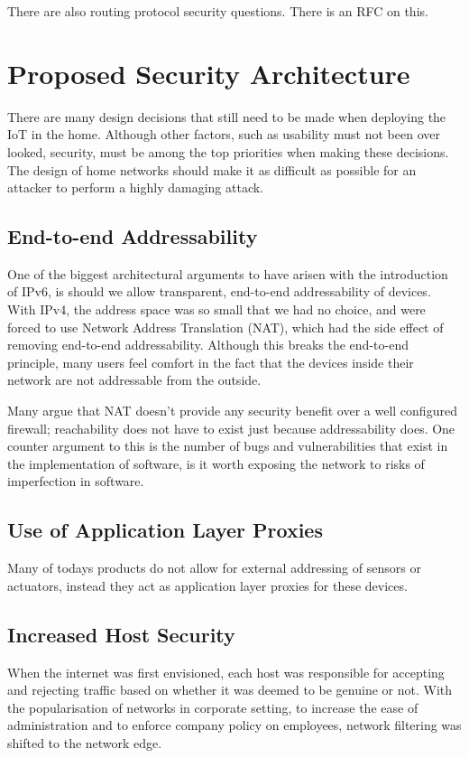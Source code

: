 \documentclass[10pt,journal,compsoc]{IEEEtran}
\begin{document}
There are also routing protocol security questions. There is an RFC on this.  

\section{Proposed Security Architecture}
There are many design decisions that still need to be made when deploying the
IoT in the home. Although other factors, such as usability must not been over
looked, security, must be among the top priorities when making these decisions.
The design of home networks should make it as difficult as possible for an
attacker to perform a highly damaging attack. 

\subsection{End-to-end Addressability}
One of the biggest architectural arguments to have arisen with the introduction
of IPv6, is should we allow transparent, end-to-end addressability of devices.
With IPv4, the address space was so small that we had no choice, and were
forced to use Network Address Translation (NAT), which had the side effect of
removing end-to-end addressability. Although this breaks the end-to-end
principle, many users feel comfort in the fact that the devices inside their
network are not addressable from the outside.  

Many argue that NAT doesn't provide any security benefit over a well configured
firewall; reachability does not have to exist just because addressability does.
One counter argument to this is the number of bugs and vulnerabilities that
exist in the implementation of software, is it worth exposing the network to
risks of imperfection in software.

\subsection{Use of Application Layer Proxies}
Many of todays products do not allow for external addressing of sensors or
actuators, instead they act as application layer proxies for these devices.  

\subsection{Increased Host Security}
When the internet was first envisioned, each host was responsible for accepting
and rejecting traffic based on whether it was deemed to be genuine or not. With
the popularisation of networks in corporate setting, to increase the ease of
administration and to enforce company policy on employees, network filtering
was shifted to the network edge.
\end{document}
